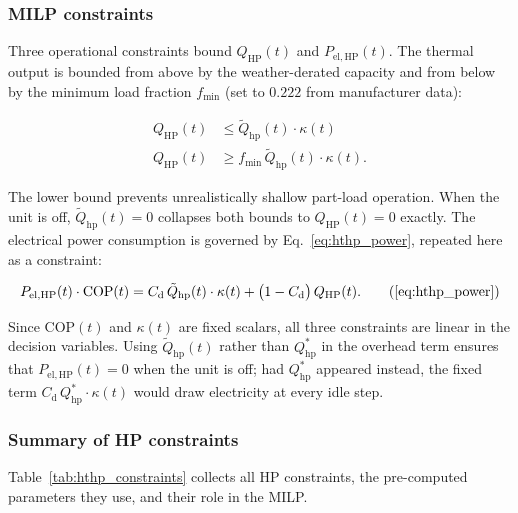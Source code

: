 \documentclass[11pt,a4paper]{report}
\begin{document}
\subsubsection{MILP constraints}
\label{sub:hthp_constraints}

Three operational constraints bound $Q_\mathrm{HP}(t)$ and $P_\mathrm{el,HP}(t)$.
The thermal output is bounded from above by the weather-derated capacity and from
below by the minimum load fraction $f_\mathrm{min}$ (set to $0.222$ from manufacturer
data):

\begin{align}
    Q_\mathrm{HP}(t) &\leq \tilde{Q}_\mathrm{hp}(t)\cdot\kappa(t)
        \label{eq:hthp_qmax} \\
    Q_\mathrm{HP}(t) &\geq f_\mathrm{min}\,\tilde{Q}_\mathrm{hp}(t)\cdot\kappa(t).
        \label{eq:hthp_qmin}
\end{align}

\noindent The lower bound prevents unrealistically shallow part-load operation.
When the unit is off, $\tilde{Q}_\mathrm{hp}(t)=0$ collapses both bounds to
$Q_\mathrm{HP}(t)=0$ exactly.
The electrical power consumption is governed by Eq.~\eqref{eq:hthp_power},
repeated here as a constraint:

\begin{equation}
    P_\mathrm{el,HP}(t)\cdot\mathrm{COP}(t)
    = C_\mathrm{d}\,\tilde{Q}_\mathrm{hp}(t)\cdot\kappa(t)
      + \bigl(1-C_\mathrm{d}\bigr)\,Q_\mathrm{HP}(t). \tag{\ref{eq:hthp_power}}
\end{equation}

\noindent Since $\mathrm{COP}(t)$ and $\kappa(t)$ are fixed scalars, all three
constraints are linear in the decision variables.
Using $\tilde{Q}_\mathrm{hp}(t)$ rather than $Q_\mathrm{hp}^{*}$ in the overhead
term ensures that $P_\mathrm{el,HP}(t)=0$ when the unit is off; had $Q_\mathrm{hp}^{*}$
appeared instead, the fixed term $C_\mathrm{d}\,Q_\mathrm{hp}^{*}\cdot\kappa(t)$
would draw electricity at every idle step.

\subsubsection{Summary of HP constraints}

Table~\ref{tab:hthp_constraints} collects all HP constraints, the pre-computed
parameters they use, and their role in the MILP.
\end{document}
